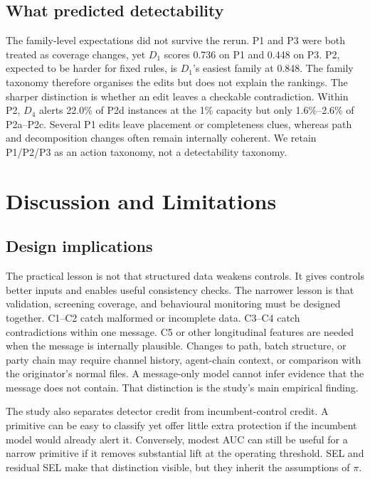 \documentclass[conference]{IEEEtran}
\begin{document}
\subsection{What predicted detectability}
The family-level expectations did not survive the rerun. P1 and P3 were both
treated as coverage changes, yet $D_1$ scores 0.736 on P1 and 0.448
on P3. P2, expected to be harder for fixed rules, is $D_1$'s easiest family
at 0.848. The family taxonomy therefore organises the edits but does not
explain the rankings. The sharper distinction is whether an edit leaves a
checkable contradiction. Within P2, $D_4$ alerts 22.0\% of P2d
instances at the 1\% capacity but only
1.6\%--2.6\% of P2a--P2c. Several P1 edits
leave placement or completeness clues, whereas path and decomposition changes
often remain internally coherent. We retain P1/P2/P3 as an action taxonomy,
not a detectability taxonomy.

\section{Discussion and Limitations}
\subsection{Design implications}
The practical lesson is not that structured data weakens controls. It gives
controls better inputs and enables useful consistency checks. The narrower
lesson is that validation, screening coverage, and behavioural monitoring must
be designed together. C1--C2 catch malformed or incomplete data. C3--C4 catch
contradictions within one message. C5 or other longitudinal features are
needed when the message is internally plausible. Changes to path, batch
structure, or party chain may require channel history, agent-chain context, or
comparison with the originator's normal files. A message-only model cannot
infer evidence that the message does not contain. That distinction is the
study's main empirical finding.

The study also separates detector credit from incumbent-control credit. A
primitive can be easy to classify yet offer little extra protection if the
incumbent model would already alert it. Conversely, modest AUC can still be
useful for a narrow primitive if it removes substantial lift at the operating
threshold. SEL and residual SEL make that distinction visible, but they inherit
the assumptions of $\pi$.
\end{document}
